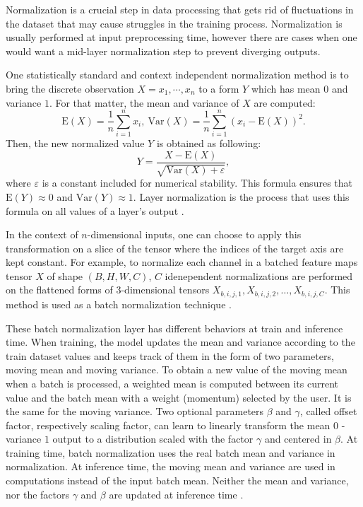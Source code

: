 Normalization is a crucial step in data processing that gets rid of fluctuations in the dataset that may cause struggles in the training process. Normalization is usually performed at input preprocessing time, however there are cases when one would want a mid-layer normalization step to prevent diverging outputs.

One statistically standard and context independent normalization method is to bring the discrete observation $X=x_1,\cdots,x_n$ to a form $Y$ which has mean $0$ and variance $1$. For that matter, the mean and variance of $X$ are computed: 
$$\mathrm{E}(X) = \frac{1}{n}\sum_{i=1}^{n}x_i, \
\mathrm{Var}(X)= \frac{1}{n}\sum_{i=1}^{n}(x_i-\mathrm{E}(X))^2.$$
Then, the new normalized value $Y$ is obtained as following:
$$ Y = \frac{X - \mathrm{E}(X)}{\sqrt{\mathrm{Var}(X) + \varepsilon}},$$ 
where $\varepsilon$ is a constant included for numerical stability. This formula ensures that $\mathrm{E}(Y)\approx 0$ and $\mathrm{Var}(Y)\approx 1$. Layer normalization is the process that uses this formula on all values of a layer's output \cite{layernorm}.

In the context of $n$-dimensional inputs, one can choose to apply this transformation on a slice of the tensor where the indices of the target axis are kept constant. For example, to normalize each channel in a batched feature maps tensor $X$ of shape $(B, H, W, C)$, $C$ idenependent normalizations are performed on the flattened forms of 3-dimensional tensors $X_{b,i,j,1}, X_{b,i,j,2}, \ldots, X_{b,i,j,C}$. This method is used as a batch normalization technique \cite{batchnorm}.

These batch  normalization layer has different behaviors at train and inference time. When training, the model updates the mean and variance according to the train dataset values and keeps track of them in the form of two parameters, moving mean and moving variance. To obtain a new value of the moving mean when a batch is processed, a weighted mean is computed between its current value and the batch mean with a weight (momentum) selected by the user. It is the same for the moving variance. Two optional parameters $\beta$ and $\gamma$, called offset factor, respectively scaling factor, can learn to linearly transform the mean $0$ - variance $1$ output to a distribution scaled with the factor $\gamma$ and centered in $\beta$. 
At training time, batch normalization uses the real batch mean and variance in normalization. At inference time, the moving mean and variance are used in computations instead of the input batch mean. Neither the mean and variance, nor the factors $\gamma$ and $\beta$ are updated at inference time \cite{batchnorm}.

